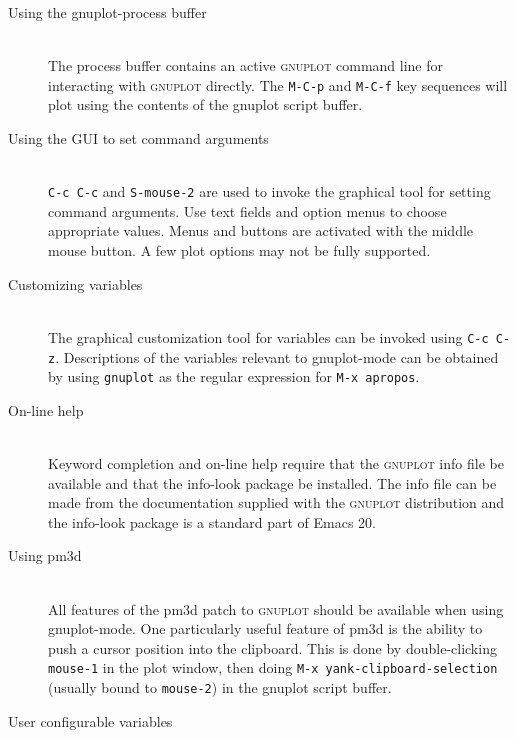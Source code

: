 \documentclass[twocolumn]{article}
\newenvironment{Boxedminipage}%
{\begin{Sbox}\begin{minipage}}%
  {\end{minipage}\end{Sbox}\Ovalbox{\TheSbox}}
\begin{document}
\vspace{4ex}

\begin{description}
\item[Using the gnuplot-process buffer] \hfill \\
  The process buffer contains an active \textsc{gnuplot} command line
  for interacting with \textsc{gnuplot} directly.  The \texttt{M-C-p}
  and \texttt{M-C-f} key sequences will plot using the contents of
  the gnuplot script buffer.
\item[Using the GUI to set command arguments] \hfill \\
  \texttt{C-c C-c} and \texttt{S-mouse-2} are used to invoke the
  graphical tool for setting command arguments.  Use text fields and
  option menus to choose appropriate values.  Menus and buttons are
  activated with the middle mouse button.  A few plot options may not
  be fully supported.
\item[Customizing variables] \hfill \\
  The graphical customization tool for variables can be invoked using
  \texttt{C-c C-z}.  Descriptions of the variables relevant to
  gnuplot-mode can be obtained by using \texttt{gnuplot} as the
  regular expression for \texttt{M-x apropos}.
\item[On-line help] \hfill \\
  Keyword completion and on-line help require that the
  \textsc{gnuplot} info file be available and that the info-look
  package be installed.  The info file can be made from the
  documentation supplied with the \textsc{gnuplot} distribution and
  the info-look package is a standard part of Emacs 20.
\item[Using pm3d] \hfill \\
  All features of the pm3d patch to \textsc{gnuplot} should be
  available when using gnuplot-mode.  One particularly useful feature
  of pm3d is the ability to push a cursor position into the
  clipboard.  This is done by double-clicking \texttt{mouse-1} in the
  plot window, then doing \texttt{M-x yank-clipboard-selection}
  (usually bound to \texttt{mouse-2}) in the gnuplot script buffer.
\end{description}



\vfill
\pagebreak


\begin{center}
  \begin{Boxedminipage}{0.75\linewidth}
    \begin{center}
      {\large User configurable variables}
    \end{center}
  \end{Boxedminipage}
\end{center}
\end{document}
